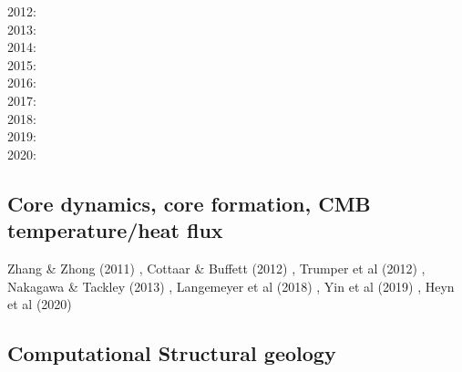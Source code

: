 {2012: \cite{crsg12}\cite{chgv12}\cite{krwd12}\cite{may12}\cite{gerb12}\cite{asmo12}\\
2013: \cite{chtl13}\cite{kemk13}\cite{gemd13}\cite{hutm13}\\
2014: \cite{thmk14}\cite{mabl14}\cite{lopp14}\cite{stlh14}\\
2015: \cite{lelk15}\cite{rumi15}\cite{chpe15}\cite{mabl15}\\
2016: \cite{dumy16}\cite{blmp16}\\
2017: \cite{robh17}\cite{wisv17}\cite{majc17}\\
2018: \cite{memm18}\cite{cram18}\\
2019: \cite{clhe19}\cite{liki19}\cite{demh19}\cite{galb19}\cite{frtv19}\cite{yuwa19}\cite{ropu19}\\
2020: \cite{homb20}\cite{trlb20}\cite{gadb20}\cite{jaca20a,jaca20b}
}

\subsection{Core dynamics, core formation, CMB temperature/heat flux}

\noindent
{\scriptsize
\cite{hayu96}\cite{boeh96}
\cite{vayu98}
\cite{nata04c}
\cite{lahb08}\cite{gost08}\cite{sata08}
\cite{kisn09}
\cite{nata10}\cite{lamg10}\cite{sate10}
Zhang \& Zhong (2011) \cite{zhzh11},
Cottaar \& Buffett (2012) \cite{cobu12},
Trumper et al (2012) \cite{trbh12},
Nakagawa \& Tackley (2013) \cite{nata13},
Langemeyer et al (2018) \cite{lalt18},
Yin et al (2019) \cite{yiym19},
Heyn et al (2020) \cite{hect20}
}

\subsection{Computational Structural geology}

